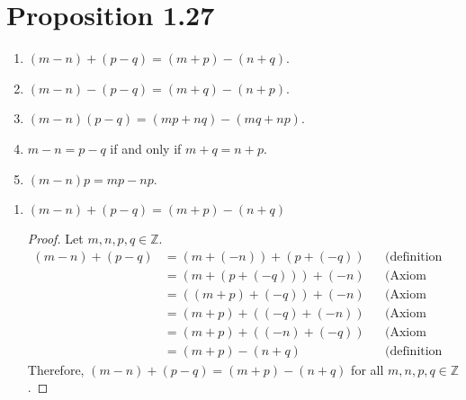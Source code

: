\section*{Proposition 1.27}
\begin{enumerate}[label=(\roman*)]
    \item $(m-n) + (p-q) = (m+p) - (n+q)$.
    \item $(m-n) - (p-q) = (m+q) - (n+p)$.
    \item $(m-n)(p-q) = (mp+nq) - (mq+np)$.
    \item $m-n = p-q$ if and only if $m+q = n+p$.
    \item $(m-n)p = mp - np$.
\end{enumerate}
\begin{enumerate}[label=(\roman*)]

    \item $(m-n)+(p-q)=(m+p)-(n+q)$
          \begin{proof}
              Let $m,n,p,q \in \mathbb{Z}$.
              \begin{align*}
                  (m-n)+(p-q) & = (m+(-n))+(p+(-q)) &  & \text{(definition of subtraction)} \\
                              & = (m+(p+(-q)))+(-n) &  & \text{(Axiom 1.1(ii))}             \\
                              & = ((m+p)+(-q))+(-n) &  & \text{(Axiom 1.1(ii))}             \\
                              & = (m+p)+((-q)+(-n)) &  & \text{(Axiom 1.1(ii))}             \\
                              & = (m+p)+((-n)+(-q)) &  & \text{(Axiom 1.1(i))}              \\
                              & = (m+p)-(n+q)       &  & \text{(definition of subtraction)}
              \end{align*}
              Therefore, $(m-n)+(p-q)=(m+p)-(n+q)$ for all $m,n,p,q \in \mathbb{Z}$.
          \end{proof}


\end{enumerate}
